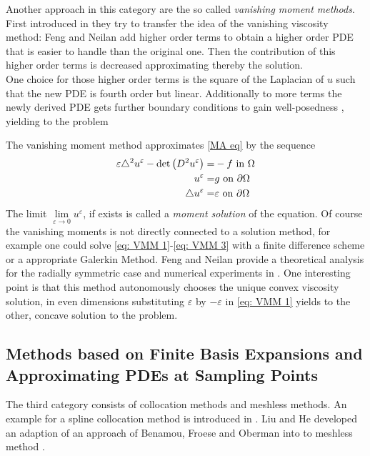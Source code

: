 Another approach in this category are the so called \emph{vanishing moment methods}. First introduced in \cite{FN2009} they try to transfer the idea of the vanishing viscosity method: Feng and Neilan add higher order terms to obtain a higher order PDE that is easier to handle than the original one. Then the contribution of this higher order terms is decreased approximating thereby the \MA solution. \\
One choice for those higher order terms is the square of the Laplacian of $u$ such that the new PDE is fourth order but linear. Additionally to more terms the newly derived PDE gets further boundary conditions to gain well-posedness , yielding to the problem
\begin{definition}
	The vanishing moment method approximates \eqref{MA eq} by the sequence
	\begin{align}
		\varepsilon \triangle^2 u^\varepsilon - \det{\left(D^2 u^\varepsilon\right)} =& -f \text{ in } \Omega \label{eq: VMM 1}\\ 
		u^\varepsilon =& g \text{ on } \partial \Omega \label{eq: VMM 2}\\
		\triangle u^\varepsilon = & \varepsilon \text{ on } \partial \Omega \label{eq: VMM 3}
	\end{align}
The limit $\lim\limits_{\varepsilon \rightarrow 0 } u^\varepsilon$, if exists is called a \emph{moment solution} of the \MA equation.
Of course the vanishing moments is not directly connected to a solution method, for example one could solve \eqref{eq: VMM 1}-\eqref{eq: VMM 3} with a finite difference scheme or a appropriate Galerkin Method.
Feng and Neilan provide a theoretical analysis for the radially symmetric case and numerical experiments in \cite{FN2009, Neilan2010, FN2011a}. One interesting point is that this method autonomously chooses the unique convex viscosity solution, in even dimensions substituting $\varepsilon$ by $-\varepsilon$ in  \eqref{eq: VMM 1} yields to the other, concave solution to the \MA problem.  
\end{definition}


\subsection{Methods based on Finite Basis Expansions and Approximating PDEs at Sampling Points}
The third category consists of collocation methods and meshless methods.
An example for a spline collocation method is introduced in \cite{BHP2014}. 
Liu and He developed an adaption of an approach of Benamou, Froese and Oberman into to meshless method \cite{LH2013}.
